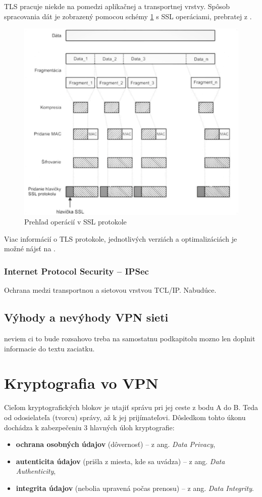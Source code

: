TLS pracuje niekde na pomedzi aplikačnej a transportnej vrstvy. Spôsob spracovania dát je zobrazený pomocou schémy \ref{ssl} s SSL operáciami, prebratej z \cite{biks}. 
\begin{figure}[!ht]
	\centering
	\includegraphics[width=0.7\linewidth]{figures/ssl}
	\caption{Prehľad operácií v SSL protokole}
	\label{ssl}
\end{figure}

Viac informácií o TLS protokole, jednotlivých verziách a optimalizáciách je možné nájsť na \cite{tls}. 

\subsection{Internet Protocol Security  -- IPSec}
Ochrana medzi transportnou a sietovou vrstvou TCL/IP.
Nabudúce. \cite{biks}

\section{Výhody a nevýhody VPN sieti}
neviem ci to bude rozsahovo treba na samostatnu podkapitolu
mozno len doplnit informacie do textu zaciatku.

\chapter{Kryptografia vo VPN}\label{krypto}
Cieľom kryptografických blokov je utajiť správu pri jej ceste z bodu A do B. Teda od odosielateľa (tvorcu) správy, až k jej prijímateľovi. Dôsledkom tohto úkonu dochádza k zabezpečeniu 3 hlavných úloh kryptografie:
\begin{itemize}
	\item \textbf{ochrana osobných údajov} (dôvernosť) -- z ang. \textit{Data Privacy}, 
	\item \textbf{autenticita údajov} (prišla z miesta, kde sa uvádza)  -- z ang. \textit{Data Authenticity},
	\item \textbf{integrita údajov} (nebolia upravená počas prenosu)  -- z ang. \textit{Data Integrity}.
\end{itemize}

